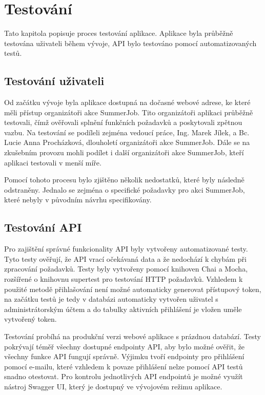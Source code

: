 \chapter{Testování}

Tato kapitola popisuje proces testování aplikace. Aplikace byla průběžně testována uživateli během vývoje, API bylo testováno pomocí automatizovaných testů.

\section{Testování uživateli}

Od začátku vývoje byla aplikace dostupná na dočasné webové adrese, ke které měli přístup organizátoři akce SummerJob. Tito organizátoři aplikaci průběžně testovali,
čímž ověřovali splnění funkčních požadavků a poskytovali zpětnou vazbu. Na testování se podíleli zejména vedoucí práce, Ing. Marek Jílek, a Bc. Lucie Anna Procházková,
dlouholetí organizátoři akce SummerJob. Dále se na zkušebním provozu mohli podílet i další organizátoři akce SummerJob, kteří aplikaci testovali v menší míře.

Pomocí tohoto procesu bylo zjištěno několik nedostatků, které byly následně odstraněny. Jednalo se zejména o specifické požadavky pro akci SummerJob, které nebyly
v původním návrhu specifikovány. 

\section{Testování API}

Pro zajištění správné funkcionality API byly vytvořeny automatizované testy. Tyto testy ověřují, že API vrací očekávaná data a že nedochází k chybám při zpracování požadavků.
Testy byly vytvořeny pomocí knihoven Chai a Mocha, rozšířené o knihovnu supertest pro testování HTTP požadavků.
Vzhledem k použité metodě přihlašování není možné automaticky generovat přístupový token, na začátku testů je tedy v databázi automaticky
vytvořen uživatel s administrátorským účtem a do tabulky aktivních přihlášení je vložen uměle vytvořený token. 

Testování probíhá na produkční verzi webové aplikace s prázdnou databází. Testy pokrývají téměř všechny dostupné endpointy API, aby bylo možné
ověřit, že všechny funkce API fungují správně. Výjimku tvoří endpointy pro přihlášení pomocí e-mailu, které vzhledem k povaze přihlášení nelze 
pomocí API testů snadno otestovat. Pro kontrolu jednotlivých API endpointů je možné využít nástroj Swagger UI, který je dostupný ve vývojovém režimu aplikace.

